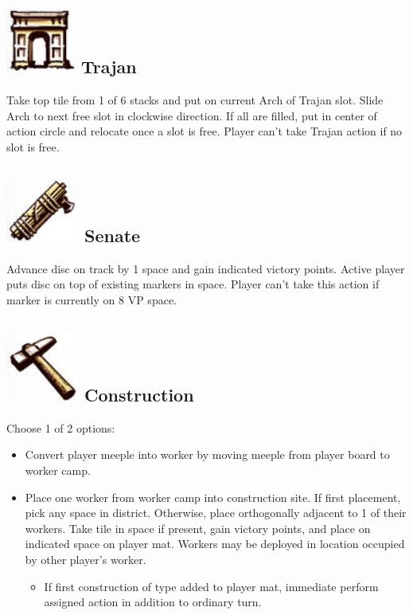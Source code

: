 \documentclass[10pt]{article}
\newenvironment{itemizeCustom}
{\begin{itemize}
  \setlength{\itemsep}{1pt}
  \setlength{\parskip}{0pt}
  \setlength{\parsep}{0pt}}
{\end{itemize}}
\begin{document}
\begin{multicols*}{2}
\begin{itemizeCustom}
    \end{itemizeCustom}

    \subsection*{\protect\includegraphics[scale=0.25]{images/trajan.jpg} Trajan}
    Take top tile from 1 of 6 stacks and put on current Arch of Trajan slot. Slide Arch to next free slot in clockwise direction. If all are filled, put in center of action circle and relocate once a slot is free. Player can't take Trajan action if no slot is free.

    \subsection*{\protect\includegraphics[scale=0.25]{images/senate.jpg} Senate}
    Advance disc on track by 1 space and gain indicated victory points. Active player puts disc on top of existing markers in space. Player can't take this action if marker is currently on 8 VP space.

    \subsection*{\protect\includegraphics[scale=0.25]{images/construction.jpg} Construction}
    Choose 1 of 2 options:
    \begin{itemizeCustom}
        \item Convert player meeple into worker by moving meeple from player board to worker camp.
        \item Place one worker from worker camp into construction site. If first placement, pick any space in district. Otherwise, place orthogonally adjacent to 1 of their workers. Take tile in space if present, gain victory points, and place on indicated space on player mat. Workers may be deployed in location occupied by other player's worker.
            \begin{itemizeCustom}
            \item If first construction of type added to player mat, immediate perform assigned action in addition to ordinary turn.
            \end{itemizeCustom}
    \end{itemizeCustom}



\end{multicols*}
\end{document}
